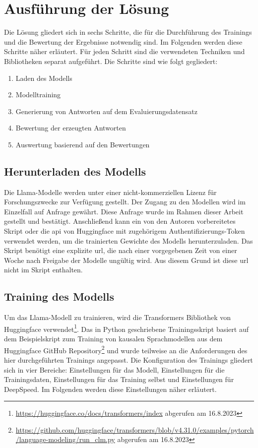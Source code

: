 \chapter{Ausführung der Lösung}\label{ch:solution}

Die Lösung gliedert sich in sechs Schritte, die für die Durchführung des Trainings und die Bewertung der Ergebnisse notwendig sind.
Im Folgenden werden diese Schritte näher erläutert. Für jeden Schritt sind die verwendeten Techniken und Bibliotheken separat aufgeführt.
Die Schritte sind wie folgt gegliedert:
\begin{enumerate}
    \item Laden des Modells
    \item Modelltraining
    \item Generierung von Antworten auf dem Evaluierungsdatensatz
    \item Bewertung der erzeugten Antworten
    \item Auswertung basierend auf den Bewertungen
\end{enumerate}

\section{Herunterladen des Modells}
Die Llama-Modelle werden unter einer nicht-kommerziellen Lizenz für Forschungszwecke zur Verfügung gestellt. Der Zugang zu den Modellen wird im Einzelfall auf Anfrage gewährt. Diese Anfrage wurde im Rahmen dieser Arbeit gestellt und bestätigt.
Anschließend kann ein von den Autoren vorbereitetes Skript oder die \ac{api} von Huggingface mit zugehörigem Authentifizierungs-Token verwendet werden, um die trainierten Gewichte des Modells herunterzuladen.
Das Skript benötigt eine explizite \ac{url}, die nach einer vorgegebenen Zeit von einer Woche nach Freigabe der Modelle ungültig wird. Aus diesem Grund ist diese \ac{url} nicht im Skript enthalten.

\section{Training des Modells}
Um das Llama-Modell zu trainieren, wird die Transformers Bibliothek von Huggingface verwendet\footnote{\url{https://huggingface.co/docs/transformers/index} abgerufen am 16.8.2023}.
Das in Python geschriebene Trainingsskript basiert auf dem Beispielskript zum Training von kausalen Sprachmodellen
aus dem Huggingface GitHub Repository\footnote{\url{https://github.com/huggingface/transformers/blob/v4.31.0/examples/pytorch/language-modeling/run_clm.py} abgerufen am 16.8.2023}
und wurde teilweise an die Anforderungen des hier durchgeführten Trainings angepasst.
Die Konfiguration des Trainings gliedert sich in vier Bereiche: Einstellungen für das Modell, Einstellungen für die Trainingsdaten, Einstellungen für das Training selbst und Einstellungen für DeepSpeed.
Im Folgenden werden diese Einstellungen näher erläutert.
